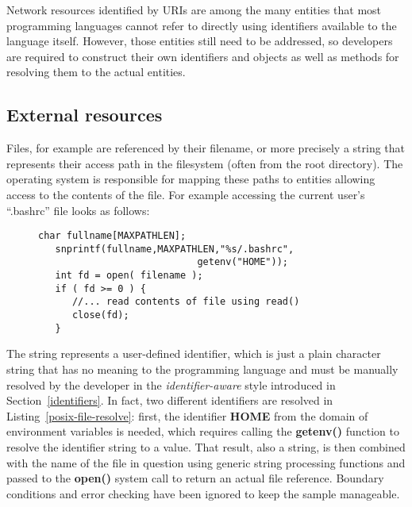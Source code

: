 \documentclass[preprint,authoryear]{acm_proc_article-sp}
\begin{document}
Network resources identified by URIs are among the many entities that most
programming languages cannot refer to directly using identifiers available to the
language itself.
However, those entities still need to be addressed, so developers are required
to construct their own identifiers  and objects as well as methods for resolving them to the actual
entities.

\subsection{External resources}

Files, for example are referenced by their filename, or more precisely
a string that represents their access path in the filesystem (often from the root 
directory).  The operating system is responsible for mapping these
paths to entities allowing access to the contents of the file.  For example accessing
the current user's ``.bashrc'' file looks as follows:


\begin{figure}[htbp]
\begin{lstlisting}[style=L,label=posix-file-resolve,caption=Resolving a name to a file in the user's home directory.]
   char fullname[MAXPATHLEN];
   snprintf(fullname,MAXPATHLEN,"%s/.bashrc",
                            getenv("HOME"));
   int fd = open( filename );
   if ( fd >= 0 ) { 
      //... read contents of file using read()
      close(fd);
   }
\end{lstlisting}
\end{figure}

The string represents a user-defined identifier, which is just a plain character
string that has no meaning to the programming language and must be 
manually resolved by the developer in the {\em identifier-aware} style 
introduced in Section~\ref{identifiers}.  In fact, two different identifiers
are resolved in Listing~\ref{posix-file-resolve}:  first, the identifier {\bf HOME}
from the domain of environment variables is needed, which requires calling
the {\bf getenv()} function to resolve the identifier string to a value.  That result,
also a string, is then combined with the name of the file in question using generic
string processing functions and passed
to the {\bf open()} system call to return an actual file reference.  Boundary conditions
and error checking have been ignored to keep the sample manageable.
\end{document}
